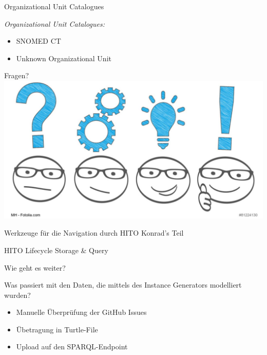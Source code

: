 \documentclass[aspectratio=1610,12pt]{beamer}
\begin{document}
\begin{frame}{Organizational Unit Catalogues}
\begin{spacing}{1.25}
  \emph{Organizational Unit Catalogues:}
  \begin{itemize}
    \item SNOMED CT
    \item Unknown Organizational Unit
  \end{itemize}
  \end{spacing}
\end{frame}

\begin{frame}{Fragen?}
  \centering
  \vspace{-0.5cm}
  \includegraphics[width=\textwidth]{img/fragen.png}
\end{frame}

\begin{frame}{Werkzeuge für die Navigation durch HITO}
  \centering
  \huge Konrad's Teil
\end{frame}

\begin{frame}{HITO Lifecycle Storage \& Query}
 \centering
  \vspace{-0.5cm}
\end{frame}

\begin{frame}{Wie geht es weiter?}
  \begin{spacing}{1.5}
    Was passiert mit den Daten, die mittels des Instance Generators modelliert wurden?
  \begin{itemize}
    \item Manuelle Überprüfung der GitHub Issues
    \item Übetragung in Turtle-File
    \item Upload auf den SPARQL-Endpoint
  \end{itemize}
\end{spacing}
\end{frame}
\end{document}
